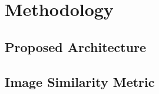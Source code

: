 
\cleardoublepage

\chapter{Methodology}
\label{methodology}

\section{Proposed Architecture}
\label{architecture}

\section{Image Similarity Metric}
\label{similarity-metric}
